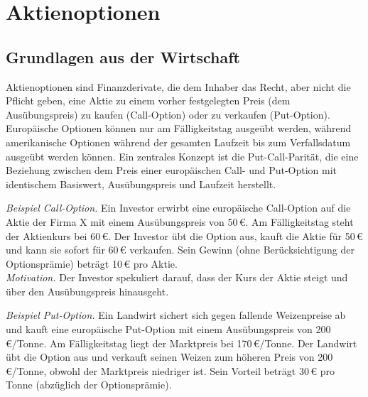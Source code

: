 \section{Aktienoptionen}

\subsection{Grundlagen aus der Wirtschaft}

Aktienoptionen sind Finanzderivate, die dem Inhaber das Recht, aber nicht die Pflicht geben, 
eine Aktie zu einem vorher festgelegten Preis (dem Ausübungspreis) zu kaufen (Call-Option) 
oder zu verkaufen (Put-Option). Europäische Optionen können nur am Fälligkeitstag ausgeübt 
werden, während amerikanische Optionen während der gesamten Laufzeit bis zum Verfallsdatum 
ausgeübt werden können. Ein zentrales Konzept ist die Put-Call-Parität, die eine Beziehung 
zwischen dem Preis einer europäischen Call- und Put-Option mit identischem Basiswert, 
Ausübungspreis und Laufzeit herstellt.

\begin{bsp}
\textit{Beispiel Call-Option.} 
Ein Investor erwirbt eine europäische Call-Option auf die Aktie der Firma X mit einem
 Ausübungspreis von 50\,€. Am Fälligkeitstag steht der Aktienkurs bei 60\,€. 
 Der Investor übt die Option aus, kauft die Aktie für 50\,€ und kann 
 sie sofort für 60\,€ verkaufen. Sein Gewinn (ohne Berücksichtigung der Optionsprämie) 
 beträgt 10\,€ pro Aktie.\\
\textit{Motivation.} Der Investor spekuliert darauf, dass der Kurs der Aktie steigt 
und über den Ausübungspreis hinausgeht.

\textit{Beispiel Put-Option.}
Ein Landwirt sichert sich gegen fallende Weizenpreise ab und kauft eine europäische 
Put-Option mit einem Ausübungspreis von 200\,€/Tonne. Am Fälligkeitstag liegt der 
Marktpreis bei 170\,€/Tonne. Der Landwirt übt die Option aus und verkauft seinen 
Weizen zum höheren Preis von 200\,€/Tonne, obwohl der Marktpreis niedriger ist. 
Sein Vorteil beträgt 30\,€ pro Tonne (abzüglich der Optionsprämie).
\end{bsp}
